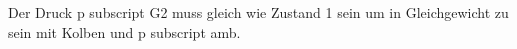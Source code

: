 Der Druck p subscript G2 muss gleich wie Zustand 1 sein um in Gleichgewicht zu sein mit Kolben und p subscript amb.